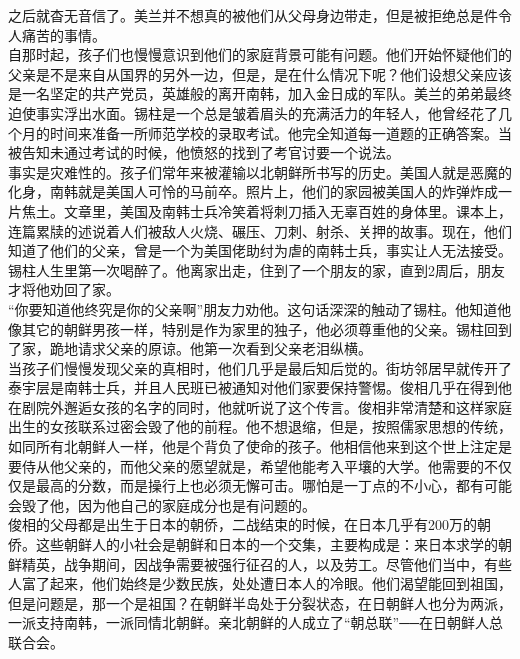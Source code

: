 之后就杳无音信了。美兰并不想真的被他们从父母身边带走，但是被拒绝总是件令人痛苦的事情。\\

自那时起，孩子们也慢慢意识到他们的家庭背景可能有问题。他们开始怀疑他们的父亲是不是来自从国界的另外一边，但是，是在什么情况下呢？他们设想父亲应该是一名坚定的共产党员，英雄般的离开南韩，加入金日成的军队。美兰的弟弟最终迫使事实浮出水面。锡柱是一个总是皱着眉头的充满活力的年轻人，他曾经花了几个月的时间来准备一所师范学校的录取考试。他完全知道每一道题的正确答案。当被告知未通过考试的时候，他愤怒的找到了考官讨要一个说法。\\

事实是灾难性的。孩子们常年来被灌输以北朝鲜所书写的历史。美国人就是恶魔的化身，南韩就是美国人可怜的马前卒。照片上，他们的家园被美国人的炸弹炸成一片焦土。文章里，美国及南韩士兵冷笑着将刺刀插入无辜百姓的身体里。课本上，连篇累牍的述说着人们被敌人火烧、碾压、刀刺、射杀、关押的故事。现在，他们知道了他们的父亲，曾是一个为美国佬助纣为虐的南韩士兵，事实让人无法接受。锡柱人生里第一次喝醉了。他离家出走，住到了一个朋友的家，直到2周后，朋友才将他劝回了家。\\

“你要知道他终究是你的父亲啊”朋友力劝他。这句话深深的触动了锡柱。他知道他像其它的朝鲜男孩一样，特别是作为家里的独子，他必须尊重他的父亲。锡柱回到了家，跪地请求父亲的原谅。他第一次看到父亲老泪纵横。\\

当孩子们慢慢发现父亲的真相时，他们几乎是最后知后觉的。街坊邻居早就传开了泰宇层是南韩士兵，并且人民班已被通知对他们家要保持警惕。俊相几乎在得到他在剧院外邂逅女孩的名字的同时，他就听说了这个传言。俊相非常清楚和这样家庭出生的女孩联系过密会毁了他的前程。他不想退缩，但是，按照儒家思想的传统，如同所有北朝鲜人一样，他是个背负了使命的孩子。他相信他来到这个世上注定是要侍从他父亲的，而他父亲的愿望就是，希望他能考入平壤的大学。他需要的不仅仅是最高的分数，而是操行上也必须无懈可击。哪怕是一丁点的不小心，都有可能会毁了他，因为他自己的家庭成分也是有问题的。\\

俊相的父母都是出生于日本的朝侨，二战结束的时候，在日本几乎有200万的朝侨。这些朝鲜人的小社会是朝鲜和日本的一个交集，主要构成是：来日本求学的朝鲜精英，战争期间，因战争需要被强行征召的人，以及劳工。尽管他们当中，有些人富了起来，他们始终是少数民族，处处遭日本人的冷眼。他们渴望能回到祖国，但是问题是，那一个是祖国？在朝鲜半岛处于分裂状态，在日朝鲜人也分为两派，一派支持南韩，一派同情北朝鲜。亲北朝鲜的人成立了“朝总联”──在日朝鲜人总联合会。\\

